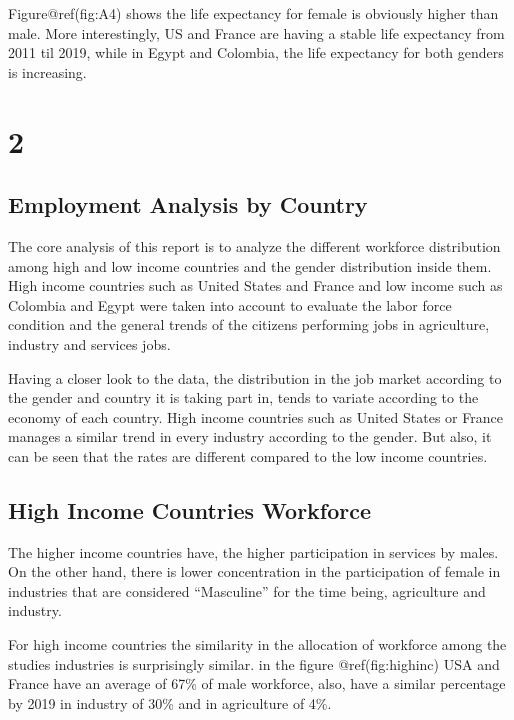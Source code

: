 \documentclass[
]{article}
\begin{document}
Figure@ref(fig:A4) shows the life expectancy for female is obviously
higher than male. More interestingly, US and France are having a stable
life expectancy from 2011 til 2019, while in Egypt and Colombia, the
life expectancy for both genders is increasing.

\clearpage

\section*{2}

\hypertarget{employment-analysis-by-country}{%
\subsection{Employment Analysis by
Country}\label{employment-analysis-by-country}}

The core analysis of this report is to analyze the different workforce
distribution among high and low income countries and the gender
distribution inside them. High income countries such as United States
and France and low income such as Colombia and Egypt were taken into
account to evaluate the labor force condition and the general trends of
the citizens performing jobs in agriculture, industry and services jobs.

Having a closer look to the data, the distribution in the job market
according to the gender and country it is taking part in, tends to
variate according to the economy of each country. High income countries
such as United States or France manages a similar trend in every
industry according to the gender. But also, it can be seen that the
rates are different compared to the low income countries.

\hypertarget{high-income-countries-workforce}{%
\subsection{High Income Countries
Workforce}\label{high-income-countries-workforce}}

The higher income countries have, the higher participation in services
by males. On the other hand, there is lower concentration in the
participation of female in industries that are considered ``Masculine''
for the time being, agriculture and industry.

For high income countries the similarity in the allocation of workforce
among the studies industries is surprisingly similar. in the figure
@ref(fig:highinc) USA and France have an average of 67\% of male
workforce, also, have a similar percentage by 2019 in industry of 30\%
and in agriculture of 4\%.
\end{document}
